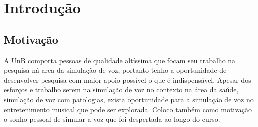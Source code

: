 
\chapter{Introdução}

	\section{Motivação}
		
	A UnB comporta pessoas de qualidade altíssima que focam seu trabalho na pesquisa ná area da simulação de voz, portanto tenho a oportunidade de desenvolver pesquisa com maior apoio possível o que é indispensável. Apesar dos esforços e trabalho serem na simulação de voz no contexto na área da saúde, simulação de voz com patologias, exista oportunidade para a simulação de voz no entretenimento musical que pode ser explorada. Coloco também como motivação o sonho pessoal de simular a voz que foi despertada ao longo do curso.
		
	